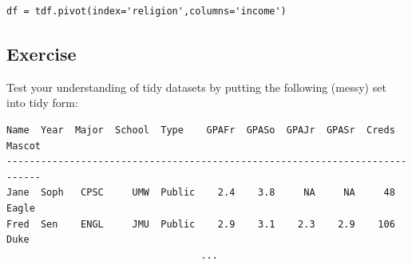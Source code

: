 \documentclass[12pt]{article}
\begin{document}
\begin{Verbatim}[fontsize=small,samepage=true,frame=none]
df = tdf.pivot(index='religion',columns='income')
\end{Verbatim}

\vspace{.1in}
\subsection{Exercise}

Test your understanding of tidy datasets by putting the following (messy) set
into tidy form:

\small
\begin{Verbatim}[fontsize=small,samepage=true,frame=none]
Name  Year  Major  School  Type    GPAFr  GPASo  GPAJr  GPASr  Creds  Mascot
----------------------------------------------------------------------------
Jane  Soph   CPSC     UMW  Public    2.4    3.8     NA     NA     48   Eagle
Fred  Sen    ENGL     JMU  Public    2.9    3.1    2.3    2.9    106   Duke 
                                  ...
\end{Verbatim}
\normalsize

%
%
%
%
%
%
%
% 
\end{document}
